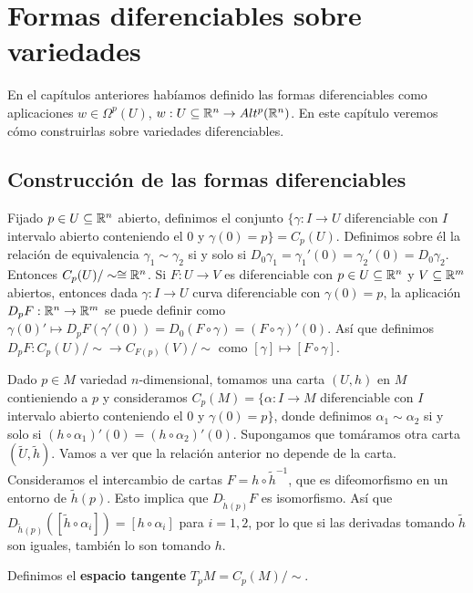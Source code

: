 \documentclass[CV.tex]{subfiles}
\begin{document}

\chapter{Formas diferenciables sobre variedades}

En el capítulos anteriores habíamos definido las formas diferenciables como aplicaciones $w\in\Omega^p(U)$, $w:U\subseteq\mathbb{R}^n\to Alt^p(\mathbb{R}^n)$. En este capítulo veremos cómo construirlas sobre variedades diferenciables.

\section{Construcción de las formas diferenciables}

Fijado $p\in U\subseteq\mathbb{R}^n$ abierto, definimos el conjunto $\{\gamma:I\to U$ diferenciable con $I$ intervalo abierto conteniendo el 0 y $\gamma(0)=p\}=C_p(U)$. Definimos sobre él la relación de equivalencia $\gamma_1\sim\gamma_2$ si y solo si $D_0\gamma_1=\gamma_1'(0)=\gamma_2'(0)=D_0\gamma_2$. Entonces $C_p(U)/\sim\cong\mathbb{R}^n$. Si $F:U\to V$ es diferenciable con $p\in U\subseteq\mathbb{R}^n$ y $V\subseteq\mathbb{R}^m$ abiertos, entonces dada $\gamma:I\to U$ curva diferenciable con $\gamma(0)=p$, la aplicación $D_pF:\mathbb{R}^n\to \mathbb{R}^m$ se puede definir como $\gamma(0)'\mapsto D_pF(\gamma'(0))=D_0(F\circ\gamma)=(F\circ \gamma)'(0)$.  Así que definimos $D_pF:C_p(U)/\sim\to C_{F(p)}(V)/\sim$ como $[\gamma]\mapsto[F\circ\gamma]$.

Dado $p\in M$ variedad $n$-dimensional, tomamos una carta $(U,h)$ en $M$ contieniendo a $p$ y consideramos $C_p(M)=\{\alpha:I\to M$ diferenciable con $I$ intervalo abierto conteniendo el 0 y $\gamma(0)=p\}$, donde definimos $\alpha_1\sim\alpha_2$ si y solo si $(h\circ\alpha_1)'(0)=(h\circ\alpha_2)'(0)$. Supongamos que tomáramos otra carta $(\widetilde{U},\tilde{h})$. Vamos a ver que la relación anterior no depende de la carta. Consideramos el intercambio de cartas $F=h\circ\tilde{h}^{-1}$, que es difeomorfismo en un entorno de $\tilde{h}(p)$. Esto implica que $D_{\tilde{h}(p)}F$ es isomorfismo. Así que $D_{\tilde{h}(p)}([\tilde{h}\circ\alpha_i])=[h\circ \alpha_i]$ para $i=1,2$, por lo que si las derivadas tomando $\tilde{h}$ son iguales, también lo son tomando $h$.

\begin{defi}
Definimos el \textbf{espacio tangente} $T_pM=C_p(M)/\sim$.
\end{defi}
\end{document}
